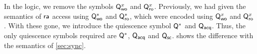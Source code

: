 In the logic, we remove the symbols $\mathsf{Q}_{\mathsf{wo}}^{x}$ and $\mathsf{Q}_{\mathsf{ro}}^{x}$.
Previously, we had given the semantics of ${\mathsf{ra}}$ access using $\mathsf{Q}_{\mathsf{wo}}^{*}$ and
$\mathsf{Q}_{\mathsf{ro}}^{*}$, which were encoded using $\mathsf{Q}_{\mathsf{wo}}^{x}$ and $\mathsf{Q}_{\mathsf{ro}}^{x}$.  With these
gone, we introduce the quiescence symbol $\mathsf{Q}^{*}$ and $\mathsf{Q}_{\mathsf{acq}}$.  Thus, the only
quiescence symbols required are $\mathsf{Q}^{*}$, $\mathsf{Q}_{\mathsf{acq}}$ and $\mathsf{Q}_{\mathsf{sc}}$.
 shows the difference with the semantics of \textsection\ref{sec:sync}.


\begin{comment}
  Let formulae $\QS{\aLoc}{\amode}$ and $\QL{\aLoc}{\amode}$ be defined:
  \begin{align*}
    \QS{\aLoc}{\mRLX}&=\Qr{\aLoc}\land\Qw{\aLoc}
    &\QL{\aLoc}{\mRLX}&=\Qw{\aLoc}
    \\
    \QS{\aLoc}{\mRA}&=
    \Qr{*}\land\Qw{*} %
    &\QL{\aLoc}{\mRA}&=\Qw{\aLoc}
    \\
    \QS{\aLoc}{\mSC}&=
    \Qr{*}\land\Qw{*} %
    \land \Qsc
    &\QL{\aLoc}{\mSC}&=\Qw{\aLoc}\land\Qsc
  \end{align*}
  Let substitutions $[\aForm/\QS{\aLoc}{\amode}]$ and  $[\aForm/\QL{\aLoc}{\amode}]$ be defined:
  \begin{align*}
    [\aForm/\QS{\aLoc}{\mRLX}] &= [\aForm/\Qw{\aLoc}]
    &{} [\aForm/\QL{\aLoc}{\mRLX}] &= [\aForm/\Qr{\aLoc}]
    \\
    [\aForm/\QS{\aLoc}{\mRA}] &= [\aForm/\Qw{\aLoc}]
    &{} [\aForm/\QL{\aLoc}{\mRA}] &= [\aForm/\Qr{*},\aForm/\Qw{*}]
    \\
    [\aForm/\QS{\aLoc}{\mSC}] &= [\aForm/\Qw{\aLoc},\aForm/\Qsc]
    &{} [\aForm/\QL{\aLoc}{\mSC}] &= [\aForm/\Qr{*},\aForm/\Qw{*},\aForm/\Qsc]
  \end{align*}
  Update \refdef{def:pomsets-trans} from: %
  \begin{enumerate}
  \item[\ref{S3})]
    $\labelingForm(\aEv)$ implies $\aExp{=}\aVal\land\QS{\aLoc}{\amode}$,
  \item[\ref{L3})]
    $\labelingForm(\aEv)$ implies $\QL{\aLoc}{\amode}$,
  \item[\ref{T3})]
    $\labelingForm(\aEv)$ implies $\labelingForm_1(\aEv)[\TRUE/\Qr{*}][\TRUE/\Qw{*}][\TRUE/\Qsc]$,

\end{comment}
